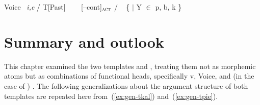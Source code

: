 \begin{exe}
\begin{xlist}
\begin{exe}
\begin{xlist}
\begin{exe}
\begin{xlist}
\begin{exe}
\begin{exe}
\begin{xlist}
\begin{exe}
\begin{xlist}
\begin{exe}
\begin{xlist}
\begin{exe}
\begin{xlist}
\begin{exe}
\begin{xlist}
\begin{exe}
\begin{xlist}
\begin{exe}
\begin{xlist}
\begin{exe}
\begin{xlist}
\begin{exe}
\begin{xlist}
\begin{exe}
\begin{xlist}
\begin{exe}
\begin{xlist}
\begin{exe}
\begin{xlist}
\begin{exe}
\begin{exe}
\begin{xlist}
\begin{exe}
\begin{xlist}
\begin{exe}
\begin{xlist}
\begin{exe}
\begin{xlist}
{\begin{exe}
\begin{xlist}
\begin{exe}
\begin{xlist}
\begin{exe}
\begin{xlist}
\begin{exe}
\begin{xlist}
\begin{xlist}
\begin{xlist}
\begin{exe}
\begin{xlist}
\begin{xlist}
\begin{xlist}
\begin{exe}
\begin{exe}
\begin{xlist}
\begin{exe}
\begin{xlist}
\begin{exe}
\begin{xlist}
\begin{exe}
\begin{xlist}
\begin{exe}
\begin{xlist}
\begin{exe}
\begin{xlist}
\begin{exe}
\begin{exe}
\begin{xlist}
\begin{xlist}
\begin{exe}
\begin{xlist}
\begin{exe}
\begin{xlist}
\begin{exe}
\begin{xlist}
\begin{exe}
\begin{xlist}
\begin{exe}
\begin{xlist}
\begin{exe}
\begin{xlist}
\begin{exe}
\begin{exe}
\begin{xlist}
\begin{exe}
\begin{xlist}
\begin{exe}
\begin{xlist}
\begin{exe}
\begin{xlist}
\begin{exe}
\begin{xlist}
\begin{exe}
\begin{xlist}
\begin{exe}
\begin{xlist}
\begin{exe}
\begin{xlist}
\begin{exe}
 \begin{xlist} 
 	\ex  \label{vi:voice2}	Voice \lra~\emph{i,e} / T[Past] \trace~\va 
	\ex  \label{vi:va}\va~\lra~[--cont]$_{\gsc{ACT}}$ / \trace~ \{  $|$ Y $\in$ p, b, k \} 
			
 \z
\z 

\section{Summary and outlook} \label{voice:conc}
This chapter examined the two templates {\tkal} and {\tpie}, treating them not as morphemic atoms but as combinations of functional heads, specifically v, Voice, and (in the case of {\tpie}) {\va}. The following generalizations about the argument structure of both templates are repeated here from~(\ref{ex:gen-tkal}) and~(\ref{ex:gen-tpie}).


\end{xlist}
\end{exe}
\end{xlist}
\end{exe}
\end{xlist}
\end{exe}
\end{xlist}
\end{exe}
\end{xlist}
\end{exe}
\end{xlist}
\end{exe}
\end{xlist}
\end{exe}
\end{xlist}
\end{exe}
\end{xlist}
\end{exe}
\end{exe}
\end{xlist}
\end{exe}
\end{xlist}
\end{exe}
\end{xlist}
\end{exe}
\end{xlist}
\end{exe}
\end{xlist}
\end{exe}
\end{xlist}
\end{exe}
\end{xlist}
\end{xlist}
\end{exe}
\end{exe}
\end{xlist}
\end{exe}
\end{xlist}
\end{exe}
\end{xlist}
\end{exe}
\end{xlist}
\end{exe}
\end{xlist}
\end{exe}
\end{xlist}
\end{exe}
\end{exe}
\end{xlist}
\end{xlist}
\end{xlist}
\end{exe}
\end{xlist}
\end{xlist}
\end{xlist}
\end{exe}
\end{xlist}
\end{exe}
\end{xlist}
\end{exe}
\end{xlist}
\end{exe}}
\end{xlist}
\end{exe}
\end{xlist}
\end{exe}
\end{xlist}
\end{exe}
\end{xlist}
\end{exe}
\end{exe}
\end{xlist}
\end{exe}
\end{xlist}
\end{exe}
\end{xlist}
\end{exe}
\end{xlist}
\end{exe}
\end{xlist}
\end{exe}
\end{xlist}
\end{exe}
\end{xlist}
\end{exe}
\end{xlist}
\end{exe}
\end{xlist}
\end{exe}
\end{xlist}
\end{exe}
\end{xlist}
\end{exe}
\end{xlist}
\end{exe}
\end{exe}
\end{xlist}
\end{exe}
\end{xlist}
\end{exe}
\end{xlist}
\end{exe}
